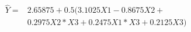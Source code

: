 

\[
\begin{array}{ll} \hat{Y} = & 2.65875 +  0.5(3.1025X1 - 0.8675X2 + \\ &0.2975X2*X3 + 0.2475X1*X3 + 0.2125X3) \end{array}
\]



